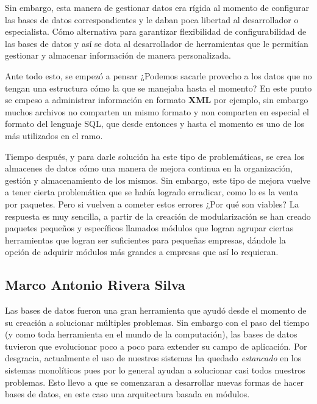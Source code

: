\documentclass[12pt]{article}
\begin{document}
Sin embargo, esta manera de gestionar datos era rígida al momento de configurar las bases de datos correspondientes y le daban poca libertad al desarrollador o especialista. Cómo alternativa para garantizar flexibilidad de configurabilidad de las bases de datos y así se dota al desarrollador de herramientas que le permitían gestionar y almacenar información de manera personalizada.\newline

Ante todo esto, se empezó a pensar ¿Podemos sacarle provecho a los datos que no tengan una estructura cómo la que se manejaba hasta el momento? En este punto se empeso a administrar información en formato \textbf{XML} por ejemplo, sin embargo muchos archivos no comparten un mismo formato y non comparten en especial el formato del lenguaje SQL, que desde entonces y hasta el momento es uno de los más utilizados en el ramo.\newline

Tiempo después, y para darle solución ha este tipo de problemáticas, se crea los almacenes de datos cómo una manera de mejora continua en la organización, gestión y almacenamiento de los mismos. Sin embargo, este tipo de mejora vuelve a tener cierta problemática que se había logrado erradicar, como lo es la venta por paquetes. Pero si vuelven a cometer estos errores ¿Por qué son viables? La respuesta es muy sencilla, a partir de la creación de modularización se han creado paquetes pequeños y específicos llamados módulos que logran agrupar ciertas herramientas que logran ser suficientes para pequeñas empresas, dándole la opción de  adquirir módulos más grandes a empresas que así lo requieran.\newpage

\subsection*{Marco Antonio Rivera Silva}

Las bases de datos fueron una gran herramienta que ayudó desde el momento de su creación a solucionar múltiples problemas. Sin embargo con el paso del tiempo (y como toda herramienta en el mundo de la computación), las bases de datos tuvieron que evolucionar poco a poco para extender su campo de aplicación. Por desgracia, actualmente el uso de nuestros sistemas ha quedado \textit{estancado} en los sistemas monolíticos pues por lo general ayudan a solucionar casi todos nuestros problemas. Esto llevo a que se comenzaran a desarrollar nuevas formas de hacer bases de datos, en este caso una arquitectura basada en módulos. \\
\end{document}
